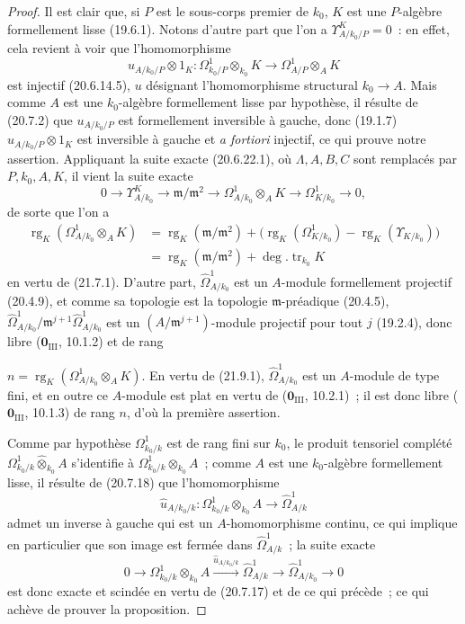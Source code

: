 \begin{proof}
Il est clair que, si $P$ est le sous-corps premier de $k_0$, $K$ est une
$P$-algèbre formellement lisse (19.6.1). Notons d'autre part que l'on a
$\Upsilon^K_{A/k_0/P}=0$~: en effet, cela revient à voir que l'homomorphisme
\[
  u_{A/k_0/P}\otimes1_K:
  \Omega^1_{k_0/P}\otimes_{k_0}K
  \longrightarrow \Omega^1_{A/P}\otimes_A K
\]
est injectif (20.6.14.5), $u$ désignant l'homomorphisme structural
$k_0\to A$. Mais comme $A$ est une $k_0$-algèbre formellement lisse par
hypothèse, il résulte de (20.7.2) que $u_{A/k_0/P}$ est formellement
inversible à gauche, donc (19.1.7) $u_{A/k_0/P}\otimes1_K$ est inversible à
gauche et \emph{a fortiori} injectif, ce qui prouve notre assertion.
Appliquant la suite exacte (20.6.22.1), où $\Lambda,A,B,C$ sont remplacés par
$P,k_0,A,K$, il vient la suite exacte
\[
  0\longrightarrow \Upsilon^K_{A/k_0}
  \longrightarrow \mathfrak m/\mathfrak m^2
  \longrightarrow \Omega^1_{A/k_0}\otimes_A K
  \longrightarrow \Omega^1_{K/k_0}\longrightarrow0,
\]
de sorte que l'on a
\[
\begin{split}
  \operatorname{rg}_K(\Omega^1_{A/k_0}\otimes_AK)
  &={\operatorname{rg}}_K(\mathfrak m/\mathfrak m^2)
    +\bigl(\operatorname{rg}_K(\Omega^1_{K/k_0})
    -\operatorname{rg}_K(\Upsilon_{K/k_0})\bigr)\\
  &={\operatorname{rg}}_K(\mathfrak m/\mathfrak m^2)
    +\deg.\operatorname{tr}_{k_0}K
\end{split}
\]
en vertu de (21.7.1). D'autre part, $\widehat\Omega^1_{A/k_0}$ est un
$A$-module formellement projectif (20.4.9), et comme sa topologie est la
topologie $\mathfrak m$-préadique (20.4.5),
$\widehat\Omega^1_{A/k_0}/\mathfrak m^{j+1}\widehat\Omega^1_{A/k_0}$ est un
$(A/\mathfrak m^{j+1})$-module projectif pour tout $j$ (19.2.4), donc libre
($\mathbf 0_{\mathrm{III}}$, 10.1.2) et de rang

$n=\operatorname{rg}_K(\Omega^1_{A/k_0}\otimes_AK)$. En vertu de (21.9.1),
$\widehat\Omega^1_{A/k_0}$ est un $A$-module de type fini, et en outre ce
$A$-module est plat en vertu de ($\mathbf 0_{\mathrm{III}}$, 10.2.1)~; il est
donc libre ($\mathbf 0_{\mathrm{III}}$, 10.1.3) de rang $n$, d'où la première
assertion.

Comme par hypothèse $\Omega^1_{k_0/k}$ est de rang fini sur $k_0$, le produit
tensoriel complété
$\Omega^1_{k_0/k}\widehat\otimes_{k_0}A$ s'identifie à
$\Omega^1_{k_0/k}\otimes_{k_0}A$~; comme $A$ est une $k_0$-algèbre
formellement lisse, il résulte de (20.7.18) que l'homomorphisme
\[
  \widehat u_{A/k_0/k}:
  \Omega^1_{k_0/k}\otimes_{k_0}A
  \longrightarrow\widehat\Omega^1_{A/k}
\]
admet un inverse à gauche qui est un $A$-homomorphisme continu, ce qui
implique en particulier que son image est fermée dans
$\widehat\Omega^1_{A/k}$~; la suite exacte
\[
  0\longrightarrow \Omega^1_{k_0/k}\otimes_{k_0}A
  \xrightarrow{\widehat u_{A/k_0/k}}\widehat\Omega^1_{A/k}
  \longrightarrow\widehat\Omega^1_{A/k_0}\longrightarrow0
\]
est donc exacte et scindée en vertu de (20.7.17) et de ce qui précède~; ce
qui achève de prouver la proposition.
\end{proof}

